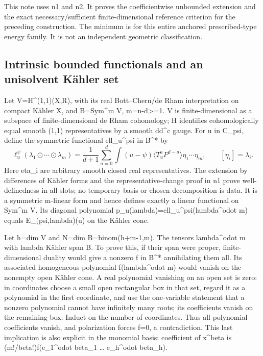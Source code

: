 \documentclass[
]{article}
\begin{document}
This note uses n1 and n2. It proves the coefficientwise unbounded
extension and the exact necessary/sufficient finite-dimensional
reference criterion for the preceding construction. The minimum is for
this entire anchored prescribed-type energy family. It is not an
independent geometric classification.

\subsection{Intrinsic bounded functionals and an unisolvent Kähler
set}\label{intrinsic-bounded-functionals-and-an-unisolvent-kuxe4hler-set}

Let V=H\^{}(1,1)(X,R), with its real Bott--Chern/de Rham interpretation
on compact Kähler X, and B=Sym\^{}m V, m=n-d\textgreater=1. V is
finite-dimensional as a subspace of finite-dimensional de Rham
cohomology; H identifies cohomologically equal smooth (1,1)
representatives by a smooth dd\^{}c gauge. For u in C\_psi, define the
symmetric functional ell\_u\^{}psi in B\^{}* by \[
\ell_u^\psi(\lambda_1\odot\cdots\odot\lambda_m)
=\frac1{d+1}\sum_{a=0}^d\int(u-\psi)
\langle T_u^aP^{d-a}\rangle\eta_1\cdots\eta_m,\qquad[\eta_i]=\lambda_i.\tag{13}
\] Here eta\_i are arbitrary smooth closed real representatives. The
extension by differences of Kähler forms and the representative-change
proof in n1 prove well-definedness in all slots; no temporary basis or
chosen decomposition is data. It is a symmetric m-linear form and hence
defines exactly a linear functional on Sym\^{}m V. Its diagonal
polynomial p\_u(lambda)=ell\_u\^{}psi(lambda\^{}odot m) equals
E\_(psi,lambda)(u) on the Kähler cone.

Let h=dim V and N=dim B=binom(h+m-1,m). The tensors lambda\^{}odot m
with lambda Kähler span B. To prove this, if their span were proper,
finite-dimensional duality would give a nonzero f in B\^{}* annihilating
them all. Its associated homogeneous polynomial f(lambda\^{}odot m)
would vanish on the nonempty open Kähler cone. A real polynomial
vanishing on an open set is zero: in coordinates choose a small open
rectangular box in that set, regard it as a polynomial in the first
coordinate, and use the one-variable statement that a nonzero polynomial
cannot have infinitely many roots; its coefficients vanish on the
remaining box. Induct on the number of coordinates. Thus all polynomial
coefficients vanish, and polarization forces f=0, a contradiction. This
last implication is also explicit in the monomial basis: coefficient of
x\^{}beta is (m!/beta!)f(e\_1\^{}odot beta\_1 \ldots{} e\_h\^{}odot
beta\_h).
\end{document}
